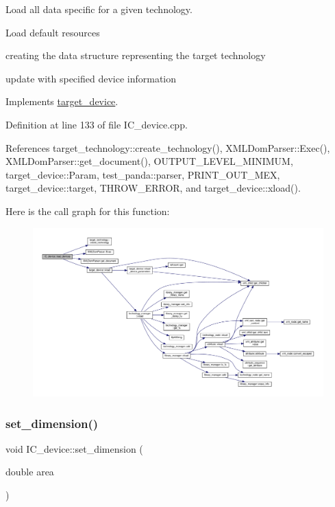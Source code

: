 Load all data specific for a given technology. 

Load default resources

creating the data structure representing the target technology

update with specified device information 

Implements \hyperlink{classtarget__device_a1823ff5860c8045600b512588415ac6e}{target\+\_\+device}.



Definition at line 133 of file I\+C\+\_\+device.\+cpp.



References target\+\_\+technology\+::create\+\_\+technology(), X\+M\+L\+Dom\+Parser\+::\+Exec(), X\+M\+L\+Dom\+Parser\+::get\+\_\+document(), O\+U\+T\+P\+U\+T\+\_\+\+L\+E\+V\+E\+L\+\_\+\+M\+I\+N\+I\+M\+UM, target\+\_\+device\+::\+Param, test\+\_\+panda\+::parser, P\+R\+I\+N\+T\+\_\+\+O\+U\+T\+\_\+\+M\+EX, target\+\_\+device\+::target, T\+H\+R\+O\+W\+\_\+\+E\+R\+R\+OR, and target\+\_\+device\+::xload().

Here is the call graph for this function\+:
\nopagebreak
\begin{figure}[H]
\begin{center}
\leavevmode
\includegraphics[width=350pt]{dc/d61/classIC__device_af925283eae225d0c6deaec8a03a8ce41_cgraph}
\end{center}
\end{figure}
\mbox{\label{classIC__device_a973f958bd8b1823f0fb4a23dbd69871e}} 
\subsubsection{\texorpdfstring{set\+\_\+dimension()}{set\_dimension()}}
{\footnotesize\ttfamily void I\+C\+\_\+device\+::set\+\_\+dimension (\begin{DoxyParamCaption}\item[{double}]{area }\end{DoxyParamCaption})\hspace{0.3cm}{\ttfamily [virtual]}}



